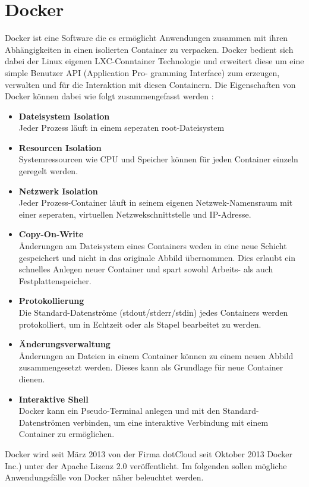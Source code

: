 \section{Docker}
\label{sec:docker}
Docker ist eine Software die es ermöglicht Anwendungen zusammen mit ihren Abhängigkeiten in einen isolierten Container zu verpacken. Docker bedient sich dabei der Linux eigenen LXC-Conntainer Technologie und erweitert diese um eine simple Benutzer API (Application Pro-
gramming Interface) zum erzeugen, verwalten und für die Interaktion mit diesen Containern.
Die Eigenschaften von Docker können dabei wie folgt zusammengefasst werden \cite{abel_docker:_2013}:
\begin{itemize}
 
      \item \textbf{Dateisystem Isolation} \\
Jeder Prozess läuft in einem seperaten root-Dateisystem
      \item \textbf{Resourcen Isolation} \\
Systemressourcen wie CPU und Speicher können für jeden Container einzeln geregelt werden.
      \item \textbf{Netzwerk Isolation} \\
Jeder Prozess-Container läuft in seinem eigenen Netzwek-Namensraum mit einer seperaten, 			virtuellen Netzwekschnittstelle und IP-Adresse.
      \item \textbf{Copy-On-Write} \\
Änderungen am Dateisystem eines Containers weden in eine neue Schicht gespeichert und nicht in das originale Abbild übernommen. Dies erlaubt ein schnelles Anlegen neuer Container und spart sowohl Arbeits- als auch Festplattenspeicher.
      \item \textbf{Protokollierung} \\
Die Standard-Datenströme (stdout/stderr/stdin) jedes Containers werden protokolliert, um in Echtzeit oder als Stapel bearbeitet zu werden.
	  \item \textbf{Änderungsverwaltung} \\
Änderungen an Dateien in einem Container können zu einem neuen Abbild zusammengesetzt werden. Dieses kann als Grundlage für neue Container dienen.
	  \item \textbf{Interaktive Shell} \\
Docker kann ein Pseudo-Terminal anlegen und mit den Standard-Datenströmen verbinden, um eine interaktive Verbindung mit einem Container zu ermöglichen.
\end{itemize}
Docker wird seit März 2013 von der Firma dotCloud seit Oktober 2013 Docker
Inc.) unter der Apache Lizenz 2.0 veröffentlicht.\cite{github_dotcloud/docker_2013}
Im folgenden sollen mögliche Anwendungsfälle von Docker näher beleuchtet werden.

